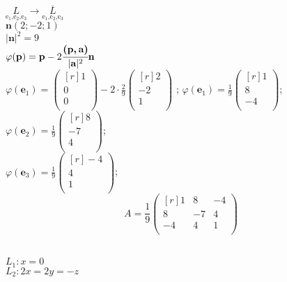 $\underset{\text{e$_1$,e$_2$,e$_3$}}{L}\rightarrow\underset{\text{e$_1$,e$_2$,e$_3$}}{\overline{L}}$\\
$\textbf{n} (2;-2;1)$\\
$|\textbf{n}|^2=9$\\
$\varphi(\textbf{p})=\textbf{p}-2\cfrac{\textbf{(p,\,a)}}{|\textbf{a}|^2}\textbf{n}$\\
$\varphi(\textbf{e$_1$})=
\left(
\begin{smallmatrix*}[r]
1\\ 0\\ 0\\
\end{smallmatrix*}
\right)
-2 \cdot \frac{2}{9} 
\left(
\begin{smallmatrix*}[r]
2\\ -2\\ 1\\
\end{smallmatrix*}
\right)$
;
$\varphi(\textbf{e$_1$})=\frac{1}{9} 
\left(
\begin{smallmatrix*}[r]
1\\ 8\\ -4\\
\end{smallmatrix*}
\right)$;\\
$\varphi(\textbf{e$_2$})=\frac{1}{9} 
\left(
\begin{smallmatrix*}[r]
8\\ -7\\ 4\\
\end{smallmatrix*}
\right)$;\\
$\varphi(\textbf{e$_3$})=\frac{1}{9} 
\left(
\begin{smallmatrix*}[r]
-4\\ 4\\ 1\\
\end{smallmatrix*}
\right)$;\\
$$
A=\frac{1}{9} 
\begin{pmatrix*}[r]
1 & 8 & -4\\
8 & -7 & 4\\
-4 & 4 & 1\\
\end{pmatrix*}
$$\\
\begin{prim}
	$L_1: x=0$\\
	$L_2: 2x=2y=-z$\\
\end{prim}\\

